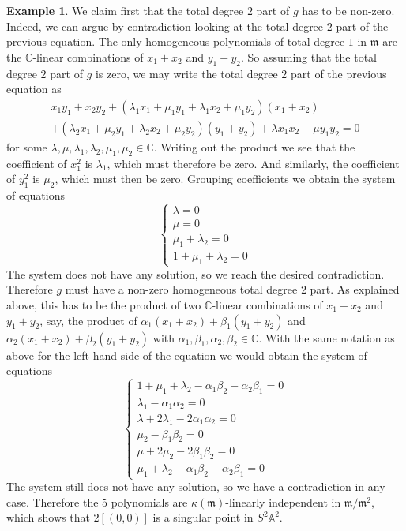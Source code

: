 \documentclass[12pt,a4paper]{amsart}
\theoremstyle{plain}
\theoremstyle{definition}
\newtheorem{exmp}[thm]{Example}
\theoremstyle{remark}
\begin{document}
\begin{exmp}
  We claim first that the total degree $2$ part of $g$ has to be non-zero.
  Indeed, we can argue by contradiction looking at the total degree $2$ part of the previous equation.
  The only homogeneous polynomials of total degree $1$ in $\mathfrak{m}$ are the $\mathbb{C}$-linear combinations of $x_{1} + x_{2}$ and $y_{1} + y_{2}$.
  So assuming that the total degree $2$ part of $g$ is zero, we may write the total degree $2$ part of the previous equation as
  \begin{align*}
    x_{1}y_{1} + x_{2}y_{2} + (\lambda_{1}x_{1} + \mu_{1}y_{1} + \lambda_{1} x_{2} + \mu_{1} y_{2})(x_{1} + x_{2}) \\
    + (\lambda_{2} x_{1} + \mu_{2} y_{1} + \lambda_{2} x_{2} + \mu_{2} y_{2})(y_{1} + y_{2}) + \lambda x_{1}x_{2} + \mu y_{1} y_{2} = 0 
  \end{align*}
  for some $\lambda, \mu, \lambda_{1}, \lambda_{2}, \mu_{1}, \mu_{2} \in \mathbb{C}$.
  Writing out the product we see that the coefficient of $x_{1}^{2}$ is $\lambda_{1}$, which must therefore be zero.
  And similarly, the coefficient of $y_{1}^{2}$ is $\mu_{2}$, which must then be zero.
  Grouping coefficients we obtain the system of equations
  \[
    \begin{cases}
      \lambda = 0 \\
      \mu = 0 \\
      \mu_{1} + \lambda_{2} = 0 \\
      1 + \mu_{1} + \lambda_{2} = 0
    \end{cases}
  \]
  The system does not have any solution, so we reach the desired contradiction.
  Therefore $g$ must have a non-zero homogeneous total degree $2$ part.
  As explained above, this has to be the product of two $\mathbb{C}$-linear combinations of $x_{1} + x_{2}$ and $y_{1} + y_{2}$, say, the product of $\alpha_{1}(x_{1} + x_{2}) + \beta_{1}(y_{1} + y_{2})$ and $\alpha_{2}(x_{1} + x_{2}) + \beta_{2}(y_{1} + y_{2})$ with $\alpha_{1}, \beta_{1}, \alpha_{2}, \beta_{2} \in \mathbb{C}$.
  With the same notation as above for the left hand side of the equation we would obtain the system of equations
  \[
    \begin{cases}
      1 + \mu_{1} + \lambda_{2} - \alpha_{1} \beta_{2} - \alpha_{2} \beta_{1} = 0 \\
      \lambda_{1} - \alpha_{1} \alpha_{2} = 0 \\
      \lambda + 2 \lambda_{1} - 2 \alpha_{1} \alpha_{2} = 0 \\
      \mu_{2} - \beta_{1} \beta_{2} =  0 \\
      \mu + 2 \mu_{2} - 2 \beta_{1} \beta_{2} = 0 \\
      \mu_{1} + \lambda_{2} - \alpha_{1} \beta_{2} - \alpha_{2} \beta_{1} = 0
    \end{cases}
  \]
  The system still does not have any solution, so we have a contradiction in any case.
  Therefore the $5$ polynomials are $\kappa(\mathfrak{m})$-linearly independent in $\mathfrak{m}/\mathfrak{m}^{2}$, which shows that $2[(0,0)]$ is a singular point in $S^{2}\mathbb{A}^{2}$.


\end{exmp}
\end{document}

